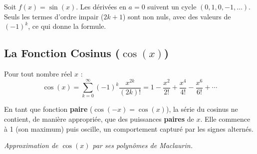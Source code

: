 \begin{proofbox}
Soit $f(x) = \sin(x)$. Les dérivées en $a=0$ suivent un cycle $(0, 1, 0, -1, \dots)$. Seuls les termes d'ordre impair ($2k+1$) sont non nuls, avec des valeurs de $(-1)^k$, ce qui donne la formule.
\end{proofbox}


\subsection{La Fonction Cosinus ($\cos(x)$)}

\begin{theorembox}
Pour tout nombre réel $x$ :
$$ \cos(x) = \sum_{k=0}^{\infty} (-1)^k \frac{x^{2k}}{(2k)!} = 1 - \frac{x^2}{2!} + \frac{x^4}{4!} - \frac{x^6}{6!} + \cdots $$
\end{theorembox}

\begin{intuitionbox}
En tant que fonction \textbf{paire} ($ \cos(-x) = \cos(x) $), la série du cosinus ne contient, de manière appropriée, que des puissances \textbf{paires} de $x$. Elle commence à 1 (son maximum) puis oscille, un comportement capturé par les signes alternés.

\tcblower

\centering
{}
\par\small\textit{Approximation de $\cos(x)$ par ses polynômes de Maclaurin.}
\end{intuitionbox}

